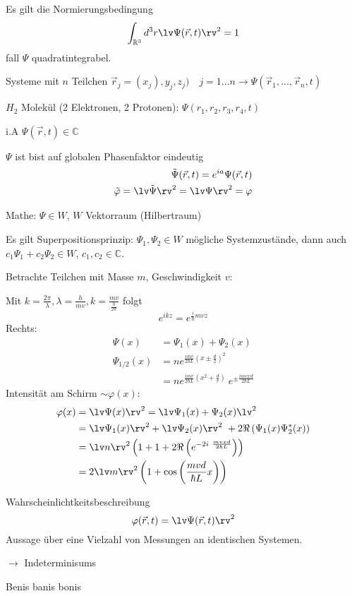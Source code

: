 Es gilt die Normierungsbedingung
\begin{equation*}
    \int_{\mathbb{R}^3} d^3 r \lv \Psi(\vec{r},t)\rv^2=1
\end{equation*}
fall $\Psi$ quadratintegrabel.
\begin{bem}
    \item 
    Systeme mit $n$ Teilchen $\vec{r}_j = (x_j),y_j,z_j) \quad j=1 \ldots
    n \rightarrow \Psi(\vec{r}_1, \ldots, \vec{r}_n,t)$

    $H_2$ Molekül (2 Elektronen, 2 Protonen): $\Psi(r_1,r_2,r_3,r_4,t)$ 
    \item
    i.A $\Psi(\vec{r},t) \in \mathbb{C}$
    \item
    $\Psi$ ist bist auf globalen Phasenfaktor eindeutig 
    \begin{align*}
        \tilde{\Psi}(\vec{r},t)=
        e^{ia} \Psi(\vec{r},t) \\
        \tilde{\varphi}=\lv \tilde{\Psi} \rv^2 = \lv \Psi \rv^2 = \varphi
    \end{align*}
    \item Mathe: $\Psi \in W$, $W$ Vektorraum (Hilbertraum)

    Es gilt Superpositionsprinzip: $\Psi_1, \Psi_2 \in W$ mögliche
    Systemzustände, dann auch $c_1 \Psi_1 + c_2 \Psi_2 \in W$, $c_1,c_2 \in
    \mathbb{C}$. 

    Betrachte Teilchen mit Masse $m$, Geschwindigkeit $v$:

    Mit
    $k=\frac{2\pi}{\lambda},\lambda=\frac{h}{mv},k=\frac{mv}{\frac{h}{2\pi}}$
    folgt
    \begin{equation*}
        e^{ikz} = e^{\frac{i}{\hbar}mvz}
    \end{equation*}
    Rechts:
    \begin{align*}
        \Psi(x) &= \Psi_1(x) + \Psi_2(x) \\
        \Psi_{1/2}(x) &= n e^{\frac{imv}{2\hbar L}\left(x \pm \frac{d}{2}\right)^2} \\
        &= n e^{\frac{imv}{2\hbar L}\left(x^2 + \frac{d}{r}\right)} \
        e^{\pm \frac{imvxd}{2\hbar L}}
    \end{align*}
    Intensität am Schirm $\sim \varphi(x)$:
    \begin{align*}
       \varphi(x) &= \lv \Psi(x) \rv^2 = \lv \Psi_1(x) + \Psi_2(x)\lv^2 \\
                &= \lv \Psi_1(x) \rv^2 + \lv \Psi_2(x) \rv^2 \
                    + 2\Re \left( \Psi_1(x) \Psi_2^*(x) \right) \\
                &= \lv n \rv^2  \left( 1 + 1 + 2\Re \left( e^{-2i \
                    \frac{mvxd}{2\hbar L}}\right) \right)\\
                &= 2 \lv m \rv^2 \left( 1 + \cos \left(\frac{mvd}{\hbar L}x \right) \right)
    \end{align*}
    \item \qme Wahrscheinlichtkeitsbeschreibung
    \begin{equation*}
        \varphi(\vec{r},t) = \lv \Psi(\vec{r},t)\rv^2
    \end{equation*}
    Aussage über eine Vielzahl von Messungen an identischen Systemen.

    $\longrightarrow$ Indeterminisums
\end{bem}
Benis
banis
bonis
